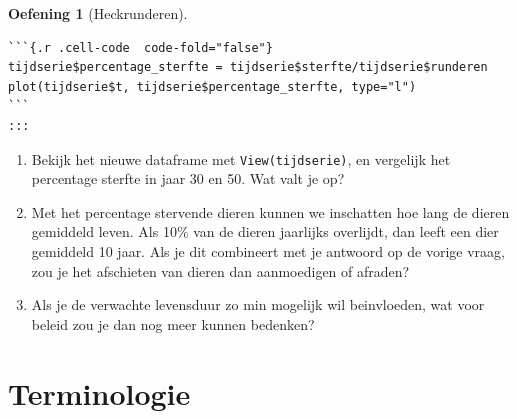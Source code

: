 \documentclass[
  a4paper,
]{scrbook}
\theoremstyle{definition}
\newtheorem{exercise}{Oefening}[chapter]
\theoremstyle{remark}
\begin{document}
\begin{exercise}[Heckrunderen]
\begin{verbatim}
```{.r .cell-code  code-fold="false"}
tijdserie$percentage_sterfte = tijdserie$sterfte/tijdserie$runderen
plot(tijdserie$t, tijdserie$percentage_sterfte, type="l")
```
:::
\end{verbatim}

\begin{enumerate}
\def\labelenumi{\alph{enumi}.}
\setcounter{enumi}{6}
\item
  Bekijk het nieuwe dataframe met \texttt{View(tijdserie)}, en vergelijk
  het percentage sterfte in jaar 30 en 50. Wat valt je op?
\item
  Met het percentage stervende dieren kunnen we inschatten hoe lang de
  dieren gemiddeld leven. Als 10\% van de dieren jaarlijks overlijdt,
  dan leeft een dier gemiddeld 10 jaar. Als je dit combineert met je
  antwoord op de vorige vraag, zou je het afschieten van dieren dan
  aanmoedigen of afraden?
\item
  Als je de verwachte levensduur zo min mogelijk wil beinvloeden, wat
  voor beleid zou je dan nog meer kunnen bedenken?
\end{enumerate}

\end{exercise}

\section{Terminologie}\label{terminologie-3}
\end{document}
